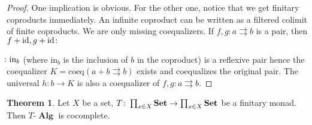 \documentclass[a4paper,11pt,twoside, openany]{book}
\newcommand{\catname}[1]{{\normalfont\textbf{#1}}}
\DeclareMathOperator{\Alg}{\mathbf{Alg}}
\newcommand{\Set}{\catname{Set}}
\DeclareMathOperator{\id}{id}
\theoremstyle{definition}
\newtheorem{thm}{Theorem}[section] %
\theoremstyle{definition}
\theoremstyle{remark}
\begin{document}
	\begin{proof}
		One implication is obvious. For the other one, notice that we get finitary coproducts immediately. An infinite coproduct can be written as a filtered colimit of finite coproducts. We are only missing coequalizers. If $f,g\colon a\rightrightarrows b$ is a pair, then $f+\id,g+\id\colon\hspace{-1.5mm}$$\hspace{-1.5mm}\colon\text{in}_b$ (where in$_b$ is the inclusion of $b$ in the coproduct) is a reflexive pair hence the coequalizer $K=\text{coeq}(a+b\rightrightarrows b)$ exists and coequalizes the original pair. The universal $h\colon b\rightarrow K$ is also a coequalizer of $f,g\colon a\rightrightarrows b$.
	\end{proof}
	\begin{thm}
		Let $X$ be a set, $T\colon\prod_{x\in X}\Set\to\prod_{x\in X}\Set$ be a finitary monad. Then $T\mbox{-}\Alg$ is cocomplete.
	\end{thm}
\end{document}
